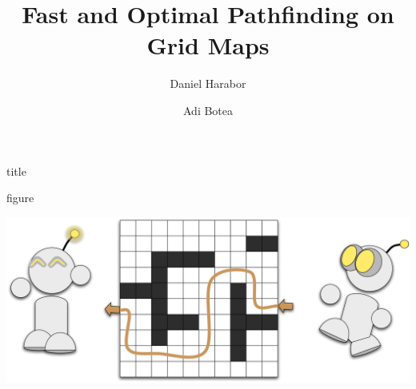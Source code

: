 \documentclass[a0,landscape]{a0poster}
\title{Fast and Optimal Pathfinding on Grid Maps}
\date{}%
\author{Daniel Harabor\protect\footnotemark[1]
\and
Adi Botea\protect\footnotemark[1]}
\begin{document}
\begin{staticcontents*}{title}
\maketitle
\end{staticcontents*}
\thispagestyle{empty} 







\begin{staticcontents*}{figure}
\begin{staticfigure}
\begin{center}
\includegraphics[width=\textwidth]{diagrams/robot_splash}
\end{center}
\end{staticfigure}
\end{staticcontents*}
\end{document}
